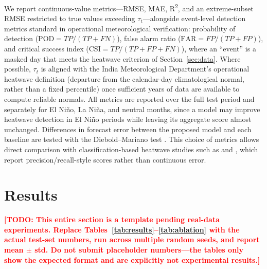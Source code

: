 \documentclass[conference]{IEEEtran}
\newcommand{\TODO}[1]{\textcolor{red}{\textbf{[TODO: #1]}}}
\begin{document}
We report continuous-value metrics---RMSE, MAE, R\textsuperscript{2}, and an extreme-subset RMSE
restricted to true values exceeding $\tau_t$---alongside event-level detection metrics standard in
operational meteorological verification: probability of detection
($\text{POD} = TP/(TP+FN)$), false alarm ratio ($\text{FAR} = FP/(TP+FP)$), and critical success index
($\text{CSI} = TP/(TP+FP+FN)$), where an ``event'' is a masked day that meets the heatwave criterion of
Section~\ref{sec:data}. Where possible, $\tau_t$ is aligned with the India Meteorological Department's
operational heatwave definition (departure from the calendar-day climatological normal, rather than a
fixed percentile) once sufficient years of data are available to compute reliable normals. All metrics
are reported over the full test period and separately for El Ni\~{n}o, La Ni\~{n}a, and neutral months,
since a model may improve heatwave detection in El Ni\~{n}o periods while leaving its aggregate score
almost unchanged. Differences in forecast error between the proposed model and each baseline are tested
with the Diebold--Mariano test \cite{diebold1995comparing}. This choice of metrics allows direct
comparison with classification-based heatwave studies such as \cite{choudary2025comparative} and
\cite{qureshi2025developing}, which report precision/recall-style scores rather than continuous error.

\section{Results}
\label{sec:results}

\TODO{This entire section is a template pending real-data experiments. Replace
Tables~\ref{tab:results}--\ref{tab:ablation} with the actual test-set numbers, run across multiple
random seeds, and report mean $\pm$ std. Do not submit placeholder numbers---the tables only show the
expected format and are explicitly not experimental results.}
\end{document}
